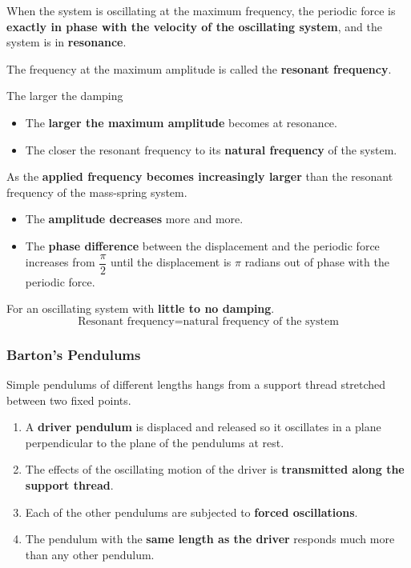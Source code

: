 When the system is oscillating at the maximum frequency, the periodic force is \textbf{exactly in phase with the velocity of the oscillating system}, and the system is in \textbf{resonance}.

The frequency at the maximum amplitude is called the \textbf{resonant frequency}.

The larger the damping
\begin{itemize}
    \item The \textbf{larger the maximum amplitude} becomes at resonance.
    \item The closer the resonant frequency to its \textbf{natural frequency} of the system.
\end{itemize}

As the \textbf{applied frequency becomes increasingly larger} than the resonant frequency of the mass-spring system.
\begin{itemize}
    \item The \textbf{amplitude decreases} more and more.
    \item The \textbf{phase difference} between the displacement and the periodic force increases from $\dfrac{\pi}{2}$ until the displacement is $\pi$ radians out of phase with the periodic force.
\end{itemize}

For an oscillating system with \textbf{little to no damping}.
$$\text{Resonant frequency}=\text{natural frequency of the system}$$

\subsubsection*{Barton's Pendulums}

Simple pendulums of different lengths hangs from a support thread stretched between two fixed points.
\begin{enumerate}
    \item A \textbf{driver pendulum} is displaced and released so it oscillates in a plane perpendicular to the plane of the pendulums at rest.
    \item The effects of the oscillating motion of the driver is \textbf{transmitted along the support thread}.
    \item Each of the other pendulums are subjected to \textbf{forced oscillations}.
    \item The pendulum with the \textbf{same length as the driver} responds much more than any other pendulum.
\end{enumerate}

